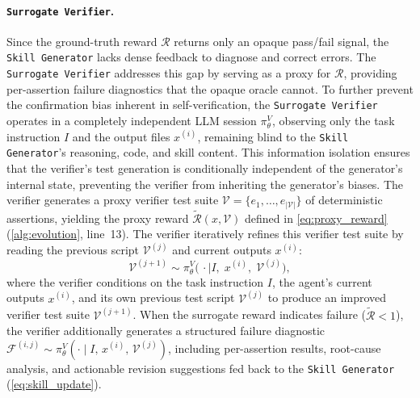 \documentclass{article}
\begin{document}
\paragraph{\texttt{Surrogate Verifier}.}
Since the ground-truth reward $\mathcal{R}$ returns only an opaque pass/fail signal, the \texttt{Skill Generator} lacks dense feedback to diagnose and correct errors. The \texttt{Surrogate Verifier} addresses this gap by serving as a proxy for $\mathcal{R}$, providing per-assertion failure diagnostics that the opaque oracle cannot. To further prevent the confirmation bias inherent in self-verification, the \texttt{Surrogate Verifier} operates in a completely independent LLM session $\pi_\theta^V$, observing only the task instruction $I$ and the output files $x^{(i)}$, remaining blind to the \texttt{Skill Generator}'s reasoning, code, and skill content. This information isolation ensures that the verifier's test generation is conditionally independent of the generator's internal state, preventing the verifier from inheriting the generator's biases.
The verifier generates a proxy verifier test suite $\mathcal{V} = \{e_1, \ldots, e_{|\mathcal{V}|}\}$ of deterministic assertions, yielding the proxy reward $\tilde{\mathcal{R}}(x, \mathcal{V})$ defined in \autoref{eq:proxy_reward} (\autoref{alg:evolution}, line~13). The verifier iteratively refines this verifier test suite by reading the previous script $\mathcal{V}^{(j)}$ and current outputs $x^{(i)}$:
\begin{equation}
    \mathcal{V}^{(j+1)} \sim \pi_\theta^{V}\!\bigl(\,\cdot \mid I,\; x^{(i)},\; \mathcal{V}^{(j)}\bigr),
    \label{eq:verifier_update}
\end{equation}
where the verifier conditions on the task instruction $I$, the agent's current outputs $x^{(i)}$, and its own previous test script $\mathcal{V}^{(j)}$ to produce an improved verifier test suite $\mathcal{V}^{(j+1)}$. When the surrogate reward indicates failure ($\tilde{\mathcal{R}} < 1$), the verifier additionally generates a structured failure diagnostic $\mathcal{F}^{(i,j)} \sim \pi_\theta^{V}(\cdot \mid I,\, x^{(i)},\, \mathcal{V}^{(j)})$, including per-assertion results, root-cause analysis, and actionable revision suggestions fed back to the \texttt{Skill Generator} (\autoref{eq:skill_update}).
\end{document}
